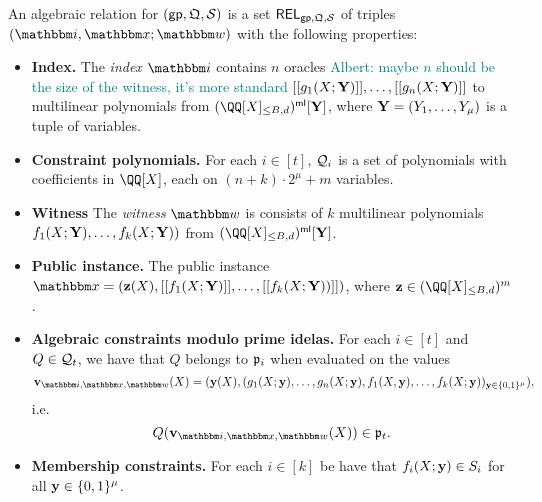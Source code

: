 \documentclass[11pt,letterpaper,usenames,dvipsnames]{article}
\newcommand{\albert}[1]{\textcolor{teal}{Albert: {#1}}}
\begin{document}
An algebraic relation for $(\mathsf{gp},\mathfrak{Q},\mathcal{S})$ is a set $\mathsf{REL}_{\mathsf{gp}, \mathfrak{Q},\mathcal{S}}$ of triples $(\idx, \inp;\wit)$ with the following properties:
\begin{itemize}
\item \textbf{Index.} The \emph{index} $\idx$ contains $n$ oracles \albert{maybe $n$ should be the size of the witness, it's more standard} $[[{g_1(X;\mathbf{Y})}]], \ldots, [[{g_n(X;\mathbf{Y})}]]$ to multilinear polynomials from $\mainQpolyring^\multilin[\YY]$, where $\mathbf{Y}=(Y_1,\ldots, Y_\mu) $ is a tuple of variables. 
  \item \textbf{Constraint polynomials.} For each $i\in [t]$, $\mathcal{Q}_i$ is a set of polynomials %
    with coefficients in $\QQ[X]$, each on $(n+ k)\cdot 2^\mu + m$ variables.
\item \textbf{Witness} The \emph{witness} $\wit$ is consists of $k$ multilinear polynomials $f_{1}(X;\mathbf{Y}),\ldots, f_{k}(X;\mathbf{Y}))$ from $\mainQpolyring^{\multilin}[\YY]$. %
\item \textbf{Public instance.} The public instance $\inp=(\zz(X), \oracle{f_1(X;\YY)}, \ldots, \oracle{f_k(X;\YY))})$, where $\zz\in \mainQpolyring^m$.
\item \textbf{Algebraic constraints modulo prime idelas.} For each  $i\in [t]$  and $Q\in \mathcal{Q}_t$, we have that $Q$ belongs to $\mathfrak{p}_i$  when evaluated on the values $$\vv_{\idx, \inp,\wit}(X)=(\yy(X), (g_1(X;\yy),\ldots, g_n(X;\yy), f_1(X,\yy),\ldots, f_k(X;\yy))_{\yy\in \BB^\mu}),$$
  i.e.
  $$
  Q(\vv_{\idx, \inp,\wit}(X)) \in \primeideal_t.
  $$
  \item \textbf{Membership constraints.} For each $i\in [k]$ be have that $f_i(X;\mathbf{y}) \in S_i$ for all $\mathbf{y}\in \{0,1\}^\mu$.
\end{itemize}
\end{document}
